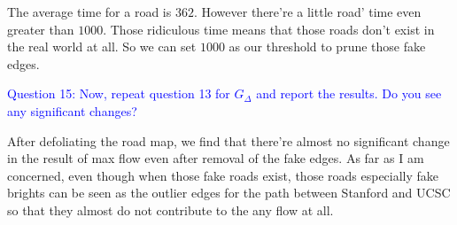 \documentclass[11pt]{article}
\begin{document}
The average time for a road is $362$. However there're a little road' time even greater than $1000$. Those ridiculous time means that those roads don't exist in the real world at all. So we can set $1000$ as our threshold to prune those fake edges.
 

\textcolor{blue}{
Question 15: Now, repeat question 13 for $G_{\Delta}$ and report the results. Do you see any significant changes?
}

After defoliating the road map, we find that there're almost no significant change in the result of max flow even after removal of the fake edges. As far as I am concerned, even though when those fake roads exist, those roads especially fake brights can be seen as the outlier edges for the path between Stanford and UCSC so that they almost do not contribute to the any flow at all.
\end{document}
